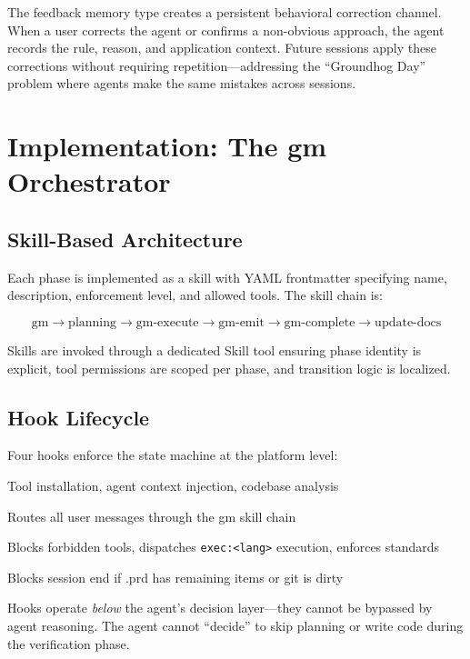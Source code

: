 \documentclass[11pt,twocolumn]{article}
\begin{document}
The feedback memory type creates a persistent behavioral correction channel. When a user corrects the agent or confirms a non-obvious approach, the agent records the rule, reason, and application context. Future sessions apply these corrections without requiring repetition---addressing the ``Groundhog Day'' problem where agents make the same mistakes across sessions.

\section{Implementation: The gm Orchestrator}
\label{sec:implementation}

\subsection{Skill-Based Architecture}

Each phase is implemented as a skill with YAML frontmatter specifying name, description, enforcement level, and allowed tools. The skill chain is:

$$\text{gm} \to \text{planning} \to \text{gm-execute} \to \text{gm-emit} \to \text{gm-complete} \to \text{update-docs}$$

Skills are invoked through a dedicated Skill tool ensuring phase identity is explicit, tool permissions are scoped per phase, and transition logic is localized.

\subsection{Hook Lifecycle}

Four hooks enforce the state machine at the platform level:

\begin{description}[nosep]
    \item[session-start] Tool installation, agent context injection, codebase analysis
    \item[prompt-submit] Routes all user messages through the gm skill chain
    \item[pre-tool-use] Blocks forbidden tools, dispatches \texttt{exec:<lang>} execution, enforces standards
    \item[stop] Blocks session end if .prd has remaining items or git is dirty
\end{description}

Hooks operate \emph{below} the agent's decision layer---they cannot be bypassed by agent reasoning. The agent cannot ``decide'' to skip planning or write code during the verification phase.
\end{document}
